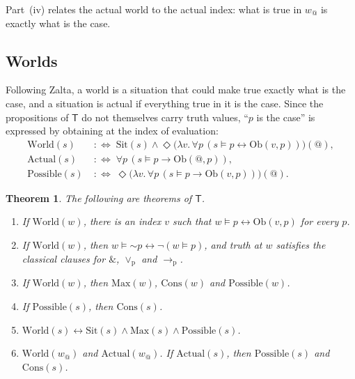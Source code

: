 \documentclass[11pt]{amsart}
\makeatletter
\theoremstyle{plain}
\newtheorem{theorem}{Theorem}[section]
\theoremstyle{definition}
\theoremstyle{remark}
\newcommand{\at}{@}
\newcommand{\aw}{w_{\at}}
\newcommand{\Sit}{\mathrm{Sit}}
\newcommand{\Obt}{\mathrm{Ob}}
\newcommand{\World}{\mathrm{World}}
\newcommand{\Actual}{\mathrm{Actual}}
\newcommand{\Poss}{\mathrm{Possible}}
\newcommand{\Max}{\mathrm{Max}}
\newcommand{\Cons}{\mathrm{Cons}}
\newcommand{\T}{\mathsf{T}}
\newcommand{\pneg}{\mathord{\sim}}
\newcommand{\pand}{\mathbin{\&}}
\newcommand{\por}{\mathbin{\vee_{\mathrm{p}}}}
\newcommand{\pimp}{\mathbin{\to_{\mathrm{p}}}}
\makeatother
\begin{document}
Part~(iv) relates the actual world to the actual index: what is true in
$\aw$ is exactly what is the case.

\subsection{Worlds}

Following Zalta, a world is a situation that could make true exactly
what is the case, and a situation is actual if everything true in it is
the case. Since the propositions of $\T$ do not themselves carry truth
values, ``$p$ is the case'' is expressed by obtaining at the index of
evaluation:
\begin{align*}
  \World(s) &\;:\Longleftrightarrow\; \Sit(s) \wedge
    \Diamond\bigl(\lambda v.\,\forall p\,
      (s \models p \leftrightarrow \Obt(v,p))\bigr)(\at),\\
  \Actual(s) &\;:\Longleftrightarrow\; \forall p\,
    (s \models p \to \Obt(\at, p)),\\
  \Poss(s) &\;:\Longleftrightarrow\;
    \Diamond\bigl(\lambda v.\,\forall p\,
      (s \models p \to \Obt(v,p))\bigr)(\at).
\end{align*}

\begin{theorem}
\label{thm:worlds}
The following are theorems of $\T$.
\begin{enumerate}[label=(\roman*)]
\item If $\World(w)$, there is an index $v$ such that
  $w \models p \leftrightarrow \Obt(v,p)$ for every $p$.
\item If $\World(w)$, then $w \models \pneg p \leftrightarrow
  \neg(w \models p)$, and truth at $w$ satisfies the classical clauses
  for $\pand$, $\por$ and $\pimp$.
\item If $\World(w)$, then $\Max(w)$, $\Cons(w)$ and $\Poss(w)$.
\item If $\Poss(s)$, then $\Cons(s)$.
\item $\World(s) \leftrightarrow \Sit(s) \wedge \Max(s) \wedge \Poss(s)$.
\item $\World(\aw)$ and $\Actual(\aw)$. If $\Actual(s)$, then
  $\Poss(s)$ and $\Cons(s)$.
\end{enumerate}
\end{theorem}
\end{document}
